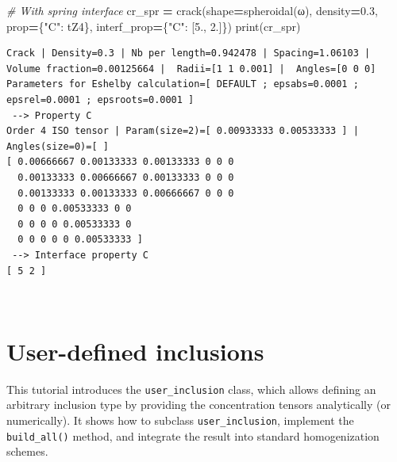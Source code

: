 \documentclass[
  a4paper,
  numbers=noendperiod,
  DIV=12]{scrreprt}
\newenvironment{Shaded}{\begin{snugshade}}{\end{snugshade}}
\newcommand{\BuiltInTok}[1]{#1}
\newcommand{\CommentTok}[1]{\textcolor[rgb]{0.56,0.35,0.01}{\textit{#1}}}
\newcommand{\FloatTok}[1]{\textcolor[rgb]{0.00,0.00,0.81}{#1}}
\newcommand{\NormalTok}[1]{#1}
\newcommand{\OperatorTok}[1]{\textcolor[rgb]{0.81,0.36,0.00}{\textbf{#1}}}
\newcommand{\StringTok}[1]{\textcolor[rgb]{0.31,0.60,0.02}{#1}}
\begin{document}
\begin{Shaded}
\begin{Highlighting}[]
\CommentTok{\# With spring interface}
\NormalTok{cr\_spr }\OperatorTok{=}\NormalTok{ crack(shape}\OperatorTok{=}\NormalTok{spheroidal(ω), density}\OperatorTok{=}\FloatTok{0.3}\NormalTok{,}
\NormalTok{               prop}\OperatorTok{=}\NormalTok{\{}\StringTok{"C"}\NormalTok{: tZ4\},}
\NormalTok{               interf\_prop}\OperatorTok{=}\NormalTok{\{}\StringTok{"C"}\NormalTok{: [}\FloatTok{5.}\NormalTok{, }\FloatTok{2.}\NormalTok{]\})}
\BuiltInTok{print}\NormalTok{(cr\_spr)}
\end{Highlighting}
\end{Shaded}

\begin{verbatim}
Crack | Density=0.3 | Nb per length=0.942478 | Spacing=1.06103 | Volume fraction=0.00125664 |  Radii=[1 1 0.001] |  Angles=[0 0 0]
Parameters for Eshelby calculation=[ DEFAULT ; epsabs=0.0001 ; epsrel=0.0001 ; epsroots=0.0001 ]
 --> Property C
Order 4 ISO tensor | Param(size=2)=[ 0.00933333 0.00533333 ] | Angles(size=0)=[ ]
[ 0.00666667 0.00133333 0.00133333 0 0 0 
  0.00133333 0.00666667 0.00133333 0 0 0 
  0.00133333 0.00133333 0.00666667 0 0 0 
  0 0 0 0.00533333 0 0 
  0 0 0 0 0.00533333 0 
  0 0 0 0 0 0.00533333 ]
 --> Interface property C
[ 5 2 ]
\end{verbatim}

\(\,\)

\chapter{User-defined inclusions}\label{sec-user_inclusion}

\begin{tcolorbox}[enhanced jigsaw, arc=.35mm, bottomrule=.15mm, bottomtitle=1mm, breakable, colback=white, colbacktitle=quarto-callout-important-color!10!white, colframe=quarto-callout-important-color-frame, coltitle=black, left=2mm, leftrule=.75mm, opacityback=0, opacitybacktitle=0.6, rightrule=.15mm, title={Objectives}, titlerule=0mm, toprule=.15mm, toptitle=1mm]

This tutorial introduces the \texttt{user\_inclusion} class, which
allows defining an arbitrary inclusion type by providing the
concentration tensors analytically (or numerically). It shows how to
subclass \texttt{user\_inclusion}, implement the \texttt{build\_all()}
method, and integrate the result into standard homogenization schemes.

\end{tcolorbox}
\end{document}
